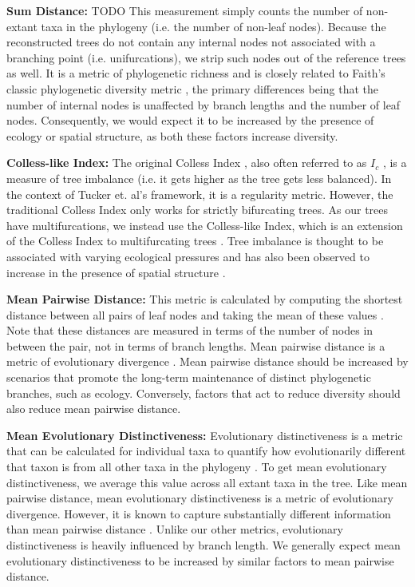 \textbf{Sum Distance:} TODO
This measurement simply counts the number of non-extant taxa in the phylogeny (i.e. the number of non-leaf nodes).
Because the reconstructed trees do not contain any internal nodes not associated with a branching point (i.e. unifurcations), we strip such nodes out of the reference trees as well.
It is a metric of phylogenetic richness and is closely related to Faith's classic phylogenetic diversity metric \citep{faithConservationEvaluationPhylogenetic1992}, the primary differences being that the number of internal nodes is unaffected by branch lengths and the number of leaf nodes.
Consequently, we would expect it to be increased by the presence of ecology or spatial structure, as both these factors increase diversity.

\textbf{Colless-like Index:}
The original Colless Index \citep{collessReviewPhylogeneticsTheory1982}, also often referred to as $I_c$ \citep{shaoTreeBalance1990}, is a measure of tree imbalance (i.e. it gets higher as the tree gets less balanced).
In the context of Tucker et.
al's framework, it is a regularity metric.
However, the traditional Colless Index only works for strictly bifurcating trees.
As our trees have multifurcations, we instead use the Colless-like Index, which is an extension of the Colless Index to multifurcating trees \citep{mirSoundCollesslikeBalance2018}.
Tree imbalance is thought to be associated with varying ecological pressures \citep{chamberlainPhylogeneticTreeShape2014, burressEcologicalOpportunityAlters} and has also been observed to increase in the presence of spatial structure \citep{scottInferringTumorProliferative2020}.

\textbf{Mean Pairwise Distance:}
This metric is calculated by computing the shortest distance between all pairs of leaf nodes and taking the mean of these values \citep{webbExploringPhylogeneticStructure2000}.
Note that these distances are measured in terms of the number of nodes in between the pair, not in terms of branch lengths.
Mean pairwise distance is a metric of evolutionary divergence \citep{tuckerGuidePhylogeneticMetrics2017}.
Mean pairwise distance should be increased by scenarios that promote the long-term maintenance of distinct phylogenetic branches, such as ecology.
Conversely, factors that act to reduce diversity should also reduce mean pairwise distance.

\textbf{Mean Evolutionary Distinctiveness:}
Evolutionary distinctiveness is a metric that can be calculated for individual taxa to quantify how evolutionarily different that taxon is from all other taxa in the phylogeny \citep{isaacMammalsEDGEConservation2007}.
To get mean evolutionary distinctiveness, we average this value across all extant taxa in the tree.
Like mean pairwise distance, mean evolutionary distinctiveness is a metric of evolutionary divergence.
However, it is known to capture substantially different information than mean pairwise distance \citep{tuckerGuidePhylogeneticMetrics2017}.
Unlike our other metrics, evolutionary distinctiveness is heavily influenced by branch length.
We generally expect mean evolutionary distinctiveness to be increased by similar factors to mean pairwise distance.

